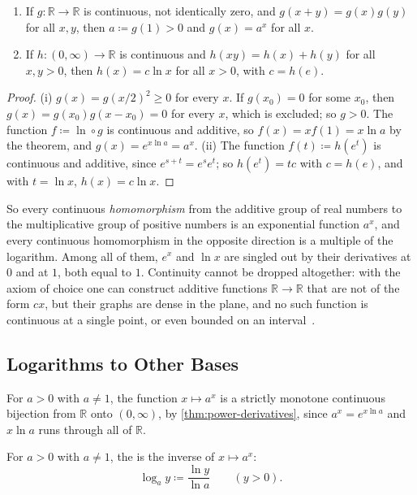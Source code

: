\begin{corollary}
\label{cor:exp-log-functional}
\leavevmode
\begin{enumerate}
\item If $g\colon\mathbb R\to\mathbb R$ is continuous, not identically zero, and $g(x+y)=g(x)g(y)$ for all $x,y$, then $a\coloneqq g(1)>0$ and $g(x)=a^x$ for all $x$.
\item If $h\colon(0,\infty)\to\mathbb R$ is continuous and $h(xy)=h(x)+h(y)$ for all $x,y>0$, then $h(x)=c\ln x$ for all $x>0$, with $c=h(e)$.
\end{enumerate}
\end{corollary}

\begin{proof}
(i) $g(x)=g(x/2)^2\ge0$ for every $x$. If $g(x_0)=0$ for some $x_0$, then $g(x)=g(x_0)g(x-x_0)=0$ for every $x$, which is excluded; so $g>0$. The function $f\coloneqq\ln\circ g$ is continuous and additive, so $f(x)=xf(1)=x\ln a$ by the theorem, and $g(x)=e^{x\ln a}=a^x$. (ii) The function $f(t)\coloneqq h(e^t)$ is continuous and additive, since $e^{s+t}=e^se^t$; so $h(e^t)=tc$ with $c=h(e)$, and with $t=\ln x$, $h(x)=c\ln x$.
\end{proof}

So every continuous \emph{homomorphism} from the additive group of real numbers to the multiplicative group of positive numbers is an exponential function $a^x$, and every continuous homomorphism in the opposite direction is a multiple of the logarithm. Among all of them, $e^x$ and $\ln x$ are singled out by their derivatives at $0$ and at $1$, both equal to $1$. Continuity cannot be dropped altogether: with the axiom of choice one can construct additive functions $\mathbb R\to\mathbb R$ that are not of the form $cx$, but their graphs are dense in the plane, and no such function is continuous at a single point, or even bounded on an interval~\cite{aczel1966}.

\subsection{Logarithms to Other Bases}

For $a>0$ with $a\ne1$, the function $x\mapsto a^x$ is a strictly monotone continuous bijection from $\mathbb R$ onto $(0,\infty)$, by \cref{thm:power-derivatives}, since $a^x=e^{x\ln a}$ and $x\ln a$ runs through all of $\mathbb R$.

\begin{definition}
\label{def:log-base}
For $a>0$ with $a\ne1$, the  is the inverse of $x\mapsto a^x$:
\[
\log_ay\coloneqq\frac{\ln y}{\ln a}\qquad(y>0).
\]
\end{definition}

